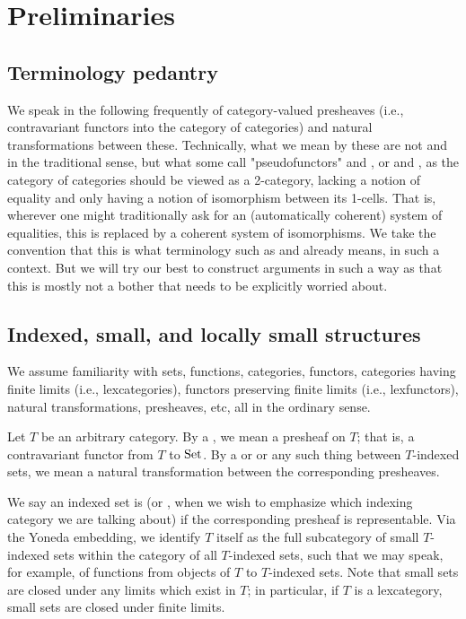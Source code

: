 \section{Preliminaries}

\subsection{Terminology pedantry}
We speak in the following frequently of category-valued presheaves (i.e., contravariant functors into the category of categories) and natural transformations between these. Technically, what we mean by these are not  and  in the traditional sense, but what some call "pseudofunctors" and , or  and , as the category of categories should be viewed as a 2-category, lacking a notion of equality and only having a notion of isomorphism between its 1-cells. That is, wherever one might traditionally ask for an (automatically coherent) system of equalities, this is replaced by a coherent system of isomorphisms. We take the convention that this is what terminology such as  and  already means, in such a context. But we will try our best to construct arguments in such a way as that this is mostly not a bother that needs to be explicitly worried about.

\subsection{Indexed, small, and locally small structures}
We assume familiarity with sets, functions, categories, functors, categories having finite limits (i.e., lexcategories), functors preserving finite limits (i.e., lexfunctors), natural transformations, presheaves, etc, all in the ordinary sense.

Let $T$ be an arbitrary category. By a , we mean a presheaf on $T$; that is, a contravariant functor from $T$ to $\mathrm{Set}$. By a  or  or any such thing between $T$-indexed sets, we mean a natural transformation between the corresponding presheaves.

We say an indexed set is  (or , when we wish to emphasize which indexing category we are talking about) if the corresponding presheaf is representable. Via the Yoneda embedding, we identify $T$ itself as the full subcategory of small $T$-indexed sets within the category of all $T$-indexed sets, such that we may speak, for example, of functions from objects of $T$ to $T$-indexed sets. Note that small sets are closed under any limits which exist in $T$; in particular, if $T$ is a lexcategory, small sets are closed under finite limits.

